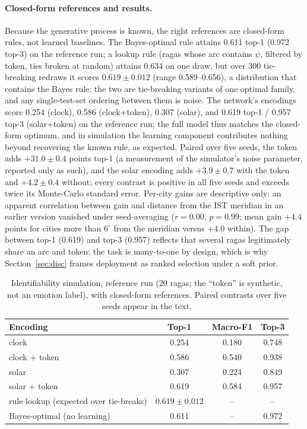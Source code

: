 \documentclass[11pt]{article}
\begin{document}
\paragraph{Closed-form references and results.}
Because the generative process is known, the right references are
closed-form rules, not learned baselines. The Bayes-optimal rule attains
0.611 top-1 (0.972 top-3) on the reference run; a lookup rule (ragas whose
arc contains $\psi$, filtered by token, ties broken at random) attains 0.634
on one draw, but over 300 tie-breaking redraws it scores $0.619 \pm 0.012$
(range 0.589--0.656), a distribution that contains the Bayes rule: the two
are tie-breaking variants of one optimal family, and any single-test-set
ordering between them is noise. The network's encodings score 0.254 (clock),
0.586 (clock+token), 0.307 (solar), and 0.619 top-1 / 0.957 top-3
(solar+token) on the reference run; the full model thus matches the
closed-form optimum, and in simulation the learning component contributes
nothing beyond recovering the known rule, as expected. Paired over five
seeds, the token adds $+31.0 \pm 0.4$ points top-1 (a measurement of the
simulator's noise parameter, reported only as such), and the solar encoding
adds $+3.9 \pm 0.7$ with the token and $+4.2 \pm 0.4$ without; every
contrast is positive in all five seeds and exceeds twice its Monte-Carlo
standard error. Per-city gains are descriptive only: an apparent correlation
between gain and distance from the IST meridian in an earlier version
vanished under seed-averaging ($r = 0.00$, $p = 0.99$; mean gain $+4.4$
points for cities more than $6^\circ$ from the meridian versus $+4.0$
within). The gap between top-1 (0.619) and top-3 (0.957) reflects that
several ragas legitimately share an arc and token; the task is many-to-one
by design, which is why Section~\ref{sec:disc} frames deployment as ranked
selection under a soft prior.

\begin{table}[h]
\centering
\caption{Identifiability simulation, reference run (20 ragas; the ``token''
is synthetic, not an emotion label), with closed-form references. Paired
contrasts over five seeds appear in the text.}
\label{tab:feas}
\begin{tabular}{lccc}
\toprule
Encoding & Top-1 & Macro-F1 & Top-3 \\
\midrule
clock            & 0.254 & 0.180 & 0.748 \\
clock + token    & 0.586 & 0.540 & 0.938 \\
solar            & 0.307 & 0.224 & 0.849 \\
solar + token    & 0.619 & 0.584 & 0.957 \\
\midrule
rule lookup (expected over tie-breaks) & $0.619 \pm 0.012$ & -- & -- \\
Bayes-optimal (no learning)            & 0.611 & -- & 0.972 \\
\bottomrule
\end{tabular}
\end{table}
\end{document}
